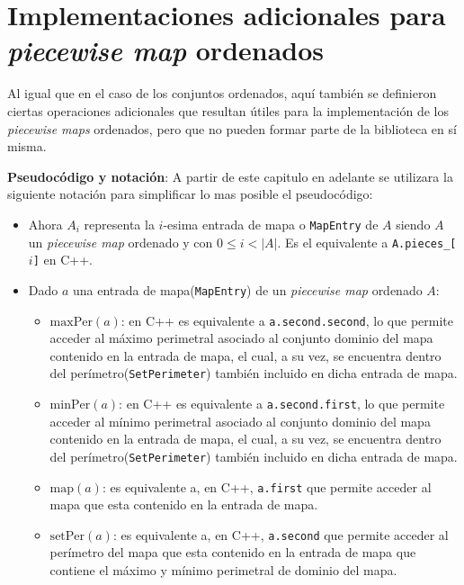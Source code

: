 \chapter{Implementaciones adicionales para  \textit{piecewise map} ordenados}


Al igual que en el caso de los conjuntos ordenados, aquí también se definieron ciertas operaciones adicionales que resultan útiles para la implementación de los \textit{piecewise maps} ordenados, pero que no pueden formar parte de la biblioteca en sí misma.

\textbf{Pseudocódigo y notación}: A partir de este capitulo en adelante se utilizara la siguiente notación para simplificar lo mas posible el pseudocódigo:

\begin{itemize}
    \item Ahora $A_i$ representa la $i$-esima entrada de mapa o \texttt{MapEntry} de $A$ siendo $A$ un \textit{piecewise map} ordenado y con $0 \leq i < |A|$. Es el equivalente a \texttt{A.pieces\_[$i$]} en C++.

    \item Dado $a$ una entrada de mapa(\texttt{MapEntry}) de un \textit{piecewise map} ordenado $A$:
    \begin{itemize}
        \item $\mathrm{maxPer}(a)$: en C++ es equivalente a \texttt{a.second.second}, 
        lo que permite acceder al máximo perimetral asociado al conjunto dominio 
        del mapa contenido en la entrada de mapa, el cual, a su vez, se encuentra 
        dentro del perímetro(\texttt{SetPerimeter}) también incluido en dicha entrada de mapa.
        
        \item $\mathrm{minPer}(a)$: en C++ es equivalente a \texttt{a.second.first}, 
        lo que permite acceder al mínimo perimetral asociado al conjunto dominio 
        del mapa contenido en la entrada de mapa, el cual, a su vez, se encuentra 
        dentro del perímetro(\texttt{SetPerimeter}) también incluido en dicha entrada de mapa.

        \item $\mathrm{map}(a)$: es equivalente a, en C++, \texttt{a.first} que permite acceder al mapa que esta contenido en la entrada de mapa.

        \item $\mathrm{setPer}(a)$: es equivalente a, en C++, \texttt{a.second} que permite acceder al perímetro  del mapa que esta contenido en la entrada de mapa que contiene el máximo y mínimo perimetral de dominio del mapa.
    \end{itemize}


\end{itemize}

